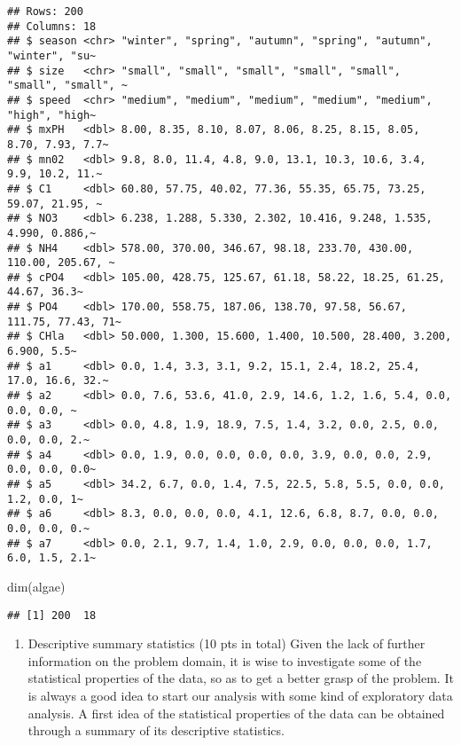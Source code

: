 \documentclass[
]{article}
\newenvironment{Shaded}{\begin{snugshade}}{\end{snugshade}}
\newcommand{\FunctionTok}[1]{\textcolor[rgb]{0.00,0.00,0.00}{#1}}
\newcommand{\NormalTok}[1]{#1}
\providecommand{\tightlist}{%
  \setlength{\itemsep}{0pt}\setlength{\parskip}{0pt}}
\begin{document}
\begin{verbatim}
## Rows: 200
## Columns: 18
## $ season <chr> "winter", "spring", "autumn", "spring", "autumn", "winter", "su~
## $ size   <chr> "small", "small", "small", "small", "small", "small", "small", ~
## $ speed  <chr> "medium", "medium", "medium", "medium", "medium", "high", "high~
## $ mxPH   <dbl> 8.00, 8.35, 8.10, 8.07, 8.06, 8.25, 8.15, 8.05, 8.70, 7.93, 7.7~
## $ mn02   <dbl> 9.8, 8.0, 11.4, 4.8, 9.0, 13.1, 10.3, 10.6, 3.4, 9.9, 10.2, 11.~
## $ C1     <dbl> 60.80, 57.75, 40.02, 77.36, 55.35, 65.75, 73.25, 59.07, 21.95, ~
## $ NO3    <dbl> 6.238, 1.288, 5.330, 2.302, 10.416, 9.248, 1.535, 4.990, 0.886,~
## $ NH4    <dbl> 578.00, 370.00, 346.67, 98.18, 233.70, 430.00, 110.00, 205.67, ~
## $ cPO4   <dbl> 105.00, 428.75, 125.67, 61.18, 58.22, 18.25, 61.25, 44.67, 36.3~
## $ PO4    <dbl> 170.00, 558.75, 187.06, 138.70, 97.58, 56.67, 111.75, 77.43, 71~
## $ CHla   <dbl> 50.000, 1.300, 15.600, 1.400, 10.500, 28.400, 3.200, 6.900, 5.5~
## $ a1     <dbl> 0.0, 1.4, 3.3, 3.1, 9.2, 15.1, 2.4, 18.2, 25.4, 17.0, 16.6, 32.~
## $ a2     <dbl> 0.0, 7.6, 53.6, 41.0, 2.9, 14.6, 1.2, 1.6, 5.4, 0.0, 0.0, 0.0, ~
## $ a3     <dbl> 0.0, 4.8, 1.9, 18.9, 7.5, 1.4, 3.2, 0.0, 2.5, 0.0, 0.0, 0.0, 2.~
## $ a4     <dbl> 0.0, 1.9, 0.0, 0.0, 0.0, 0.0, 3.9, 0.0, 0.0, 2.9, 0.0, 0.0, 0.0~
## $ a5     <dbl> 34.2, 6.7, 0.0, 1.4, 7.5, 22.5, 5.8, 5.5, 0.0, 0.0, 1.2, 0.0, 1~
## $ a6     <dbl> 8.3, 0.0, 0.0, 0.0, 4.1, 12.6, 6.8, 8.7, 0.0, 0.0, 0.0, 0.0, 0.~
## $ a7     <dbl> 0.0, 2.1, 9.7, 1.4, 1.0, 2.9, 0.0, 0.0, 0.0, 1.7, 6.0, 1.5, 2.1~
\end{verbatim}

\begin{Shaded}
\begin{Highlighting}[]
\FunctionTok{dim}\NormalTok{(algae)}
\end{Highlighting}
\end{Shaded}

\begin{verbatim}
## [1] 200  18
\end{verbatim}

\begin{enumerate}
\def\labelenumi{\arabic{enumi}.}
\tightlist
\item
  Descriptive summary statistics (10 pts in total) Given the lack of
  further information on the problem domain, it is wise to investigate
  some of the statistical properties of the data, so as to get a better
  grasp of the problem. It is always a good idea to start our analysis
  with some kind of exploratory data analysis. A first idea of the
  statistical properties of the data can be obtained through a summary
  of its descriptive statistics.
\end{enumerate}
\end{document}
